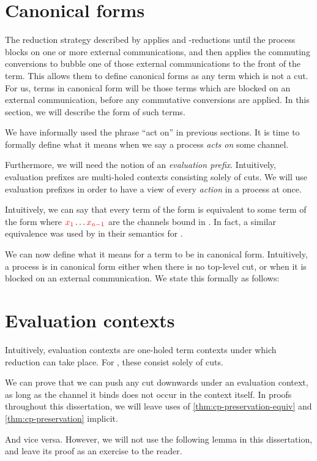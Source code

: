 \section{Canonical forms}\label{sec:cp-canonical-forms}
The reduction strategy described by \citeauthor{lindley2015semantics} applies
 and \textbeta-reductions until the process blocks on
one or more external communications, and then applies the commuting conversions
to bubble one of those external communications to the front of the term.
This allows them to define canonical forms as any term which is not a cut.
For us, terms in canonical form will be those terms which are blocked on an
external communication, before any commutative conversions are applied.
In this section, we will describe the form of such terms.

We have informally used the phrase ``act on'' in previous sections. It is time
to formally define what it means when we say a process \emph{acts on} some
channel.

Furthermore, we will need the notion of an \emph{evaluation prefix}.
Intuitively, evaluation prefixes are multi-holed contexts consisting solely of
cuts. We will use evaluation prefixes in order to have a view of every
\emph{action} in a process at once.

Intuitively, we can say that every term of the form
 is equivalent to some term of the form
where $\textcolor{red}{x_1} \dots \textcolor{red}{x_{n-1}}$ are the channels bound in .
In fact, a similar equivalence was used by \citeauthor{lindley2015semantics}
\cite{lindley2015semantics} in their semantics for \cp. 

We can now define what it means for a term to be in canonical form. Intuitively,
a process is in canonical form either when there is no top-level cut, or when it
is blocked on an external communication. We state this formally as follows:


\section{Evaluation contexts}\label{sec:cp-evaluation-contexts}
Intuitively, evaluation contexts are one-holed term contexts under which
reduction can take place. For \rcp, these consist solely of cuts.

We can prove that we can push any cut downwards under an evaluation context, as
long as the channel it binds does not occur in the context itself.
In proofs throughout this dissertation, we will leave uses of
\cref{thm:cp-preservation-equiv} and \cref{thm:cp-preservation} implicit.

And vice versa. However, we will not use the following lemma in this
dissertation, and leave its proof as an exercise to the reader.


